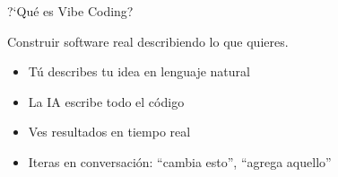\documentclass[aspectratio=169]{beamer}
\begin{document}
\begin{frame}{?`Qu\'e es Vibe Coding?}
\vspace{0.3cm}

{\large\color{accentlight} Construir software real describiendo lo que quieres.}

\vspace{0.5cm}

\begin{itemize}
\setlength\itemsep{0.6em}
\item T\'u describes tu idea en lenguaje natural
\item La IA escribe todo el c\'odigo
\item Ves resultados en tiempo real
\item Iteras en conversaci\'on: ``cambia esto'', ``agrega aquello''
\end{itemize}

\vspace{0.6cm}

\begin{center}
\end{center}
\end{frame}
\end{document}
